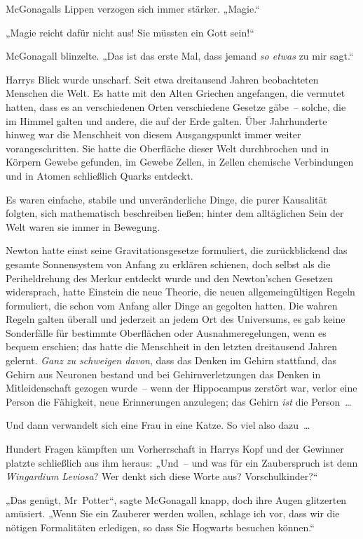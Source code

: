 {McGonagalls Lippen verzogen sich immer stärker. „Magie.“

„Magie reicht dafür nicht aus! Sie müssten ein Gott sein!“

McGonagall blinzelte. „Das ist das erste Mal, dass jemand \emph{so etwas} zu mir sagt.“

Harrys Blick wurde unscharf. Seit etwa dreitausend Jahren beobachteten Menschen die Welt. Es hatte mit den Alten Griechen angefangen, die vermutet hatten, dass es an verschiedenen Orten verschiedene Gesetze gäbe~-- solche, die im Himmel galten und andere, die auf der Erde galten. Über Jahrhunderte hinweg war die Menschheit von diesem Ausgangspunkt immer weiter vorangeschritten. Sie hatte die Oberfläche dieser Welt durchbrochen und in Körpern Gewebe gefunden, im Gewebe Zellen, in Zellen chemische Verbindungen und in Atomen schließlich Quarks entdeckt.

Es waren einfache, stabile und unveränderliche Dinge, die purer Kausalität folgten, sich mathematisch beschreiben ließen; hinter dem alltäglichen Sein der Welt waren sie immer in Bewegung.

Newton hatte einst seine Gravitationsgesetze formuliert, die zurückblickend das gesamte Sonnensystem von Anfang zu erklären schienen, doch selbst als die Periheldrehung des Merkur entdeckt wurde und den Newton'schen Gesetzen widersprach, hatte Einstein die neue Theorie, die neuen allgemeingültigen Regeln formuliert, die schon vom Anfang aller Dinge an gegolten hatten. Die wahren Regeln galten überall und jederzeit an jedem Ort des Universums, es gab keine Sonderfälle für bestimmte Oberflächen oder Ausnahmeregelungen, wenn es bequem erschien; das hatte die Menschheit in den letzten dreitausend Jahren gelernt. \emph{Ganz zu schweigen davon}, dass das Denken im Gehirn stattfand, das Gehirn aus Neuronen bestand und bei Gehirnverletzungen das Denken in Mitleidenschaft gezogen wurde~-- wenn der Hippocampus zerstört war, verlor eine Person die Fähigkeit, neue Erinnerungen anzulegen; das Gehirn \emph{ist} die Person~…

Und dann verwandelt sich eine Frau in eine Katze. So viel also dazu~…

Hundert Fragen kämpften um Vorherrschaft in Harrys Kopf und der Gewinner platzte schließlich aus ihm heraus: „Und~-- und was für ein Zauberspruch ist denn \emph{Wingardium Leviosa}? Wer denkt sich diese Worte aus? Vorschulkinder?“

„Das genügt, Mr~Potter“, sagte McGonagall knapp, doch ihre Augen glitzerten amüsiert. „Wenn Sie ein Zauberer werden wollen, schlage ich vor, dass wir die nötigen Formalitäten erledigen, so dass Sie Hogwarts besuchen können.“

}

